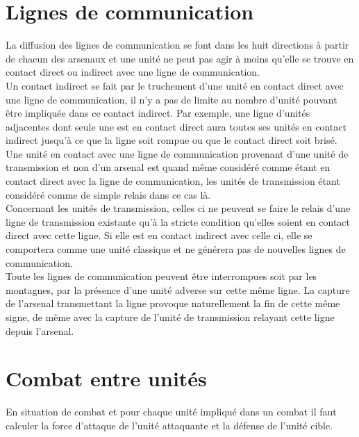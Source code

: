    	\section{Lignes de communication}	
	
	La diffusion des lignes de communication se font dans les huit directions à partir de chacun des arsenaux  et une unité ne peut pas agir à moins qu'elle se trouve en contact direct ou indirect avec une ligne de communication. \\
	
	Un contact indirect se fait par le truchement d'une unité en contact direct avec une ligne de communication, il n'y a pas de limite au nombre d'unité pouvant être impliquée dans ce contact indirect. Par exemple, une ligne d'unités adjacentes dont seule une est en contact direct aura toutes ses unités en contact indirect jusqu'à ce que la ligne soit rompue ou que le contact direct soit brisé.\\
	
	Une unité en contact avec une ligne de communication provenant d'une unité de transmission et non d'un arsenal est quand même considéré comme étant en contact direct avec la ligne de communication, les unités de transmission étant considéré comme de simple relais dans ce cas là.\\
	
	Concernant les unités de transmission, celles ci ne peuvent se faire le relais d'une ligne de transmission existante qu'à la stricte condition qu'elles soient en contact direct avec cette ligne. Si elle est en contact indirect avec celle ci, elle se comportera comme une unité classique et ne générera pas de nouvelles lignes de communication.\\
	
      Toute les lignes de communication peuvent être interrompues soit par les montagnes, par la présence d'une unité adverse sur cette même ligne. La capture de l'arsenal transmettant la ligne provoque naturellement la fin de cette même signe, de même avec la capture de l'unité de transmission relayant cette ligne depuis l'arsenal.
   
  \section{Combat entre unités}
  
	En situation de combat et pour chaque unité impliqué dans un combat il faut calculer la force d'attaque de l'unité attaquante et la défense de l'unité cible.\\	

